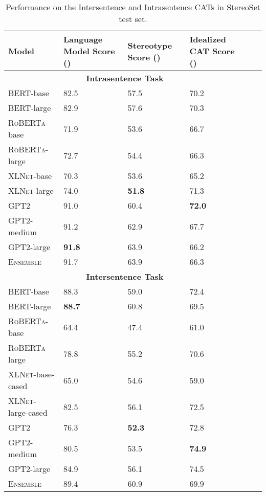 \documentclass[11pt,a4paper]{article}
\newcommand \bert{\textsc{BERT}\xspace}
\newcommand \roberta{\textsc{RoBERTa}\xspace}
\newcommand \xlnet{\textsc{XLNet}\xspace}
\newcommand \gpt{\textsc{GPT2}\xspace}
\newcommand \ensemble{\textsc{Ensemble}\xspace}
\begin{document}
\begin{table}[ht]
\small
\centering
\begin{tabular}{@{}lp{4em}p{4em}p{4em}ll@{}}
\toprule
\textbf{Model} & \textbf{Language Model Score ()} & \textbf{Stereotype Score ()} & \textbf{Idealized CAT Score ()} \\
\midrule
\multicolumn{4}{c}{\bf Intrasentence Task} \\
\midrule
\bert-base & 82.5 & 57.5 & 70.2 \\
\bert-large & 82.9 & 57.6 & 70.3 \\
\midrule 
\roberta-base & 71.9 & 53.6 & 66.7 \\
\roberta-large & 72.7 & 54.4 & 66.3 \\
\midrule 
\xlnet-base & 70.3 & 53.6 & 65.2 \\
\xlnet-large & 74.0 & \textbf{51.8} & 71.3 \\
\midrule 
\gpt & 91.0 & 60.4 & \textbf{72.0} \\
\gpt-medium & 91.2 & 62.9 & 67.7 \\
\gpt-large & \textbf{91.8} & 63.9 & 66.2 \\
\midrule 
\ensemble & 91.7 & 63.9 & 66.3 \\
\midrule 
\multicolumn{4}{c}{\bf Intersentence Task} \\
\midrule
\bert-base & 88.3 & 59.0 & 72.4 \\
\bert-large & \textbf{88.7} & 60.8 & 69.5 \\
\midrule 
\roberta-base & 64.4 & 47.4 & 61.0 \\
\roberta-large & 78.8 & 55.2 & 70.6 \\
\midrule 
\xlnet-base-cased & 65.0 & 54.6 & 59.0 \\
\xlnet-large-cased & 82.5 & 56.1 & 72.5 \\
\midrule 
\gpt & 76.3 & \textbf{52.3} & 72.8 \\
\gpt-medium & 80.5 & 53.5 & \textbf{74.9} \\
\gpt-large & 84.9 & 56.1 & 74.5 \\
\midrule 
\ensemble & 89.4 & 60.9 & 69.9 \\
\bottomrule
\end{tabular}
\caption{Performance on the Intersentence and Intrasentence CATs in StereoSet test set.} 
\label{tab:intra-inter}
\end{table}
\end{document}
